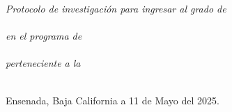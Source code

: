 \documentclass[
12pt, %
singlespacing, %
headsepline, %
]{MastersDoctoralThesis} %
\begin{document}
\begin{titlepage}
\begin{center}

\large \textit{Protocolo de investigación para ingresar al grado de\\\degreename}\\[0.5cm] %
\textit{en el programa de}\\\deptname\\[0.5cm]
\textit{perteneciente a la}\\\facname\\[0.5cm] %

\vfill

\begin{flushright}
{\small Ensenada, Baja California a 11 de Mayo del 2025.}\\[2cm] %
\end{flushright}

\end{center}
\end{titlepage}



\end{document}
